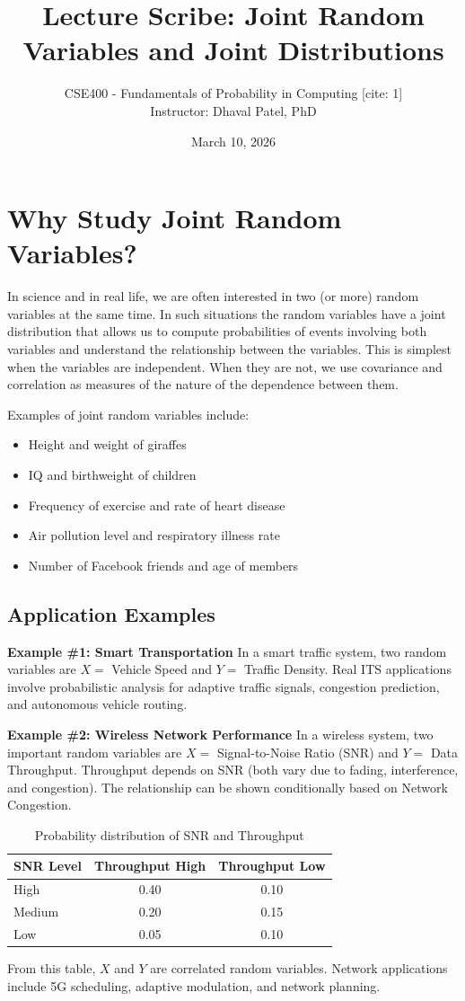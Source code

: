 \documentclass[12pt]{article}
\title{Lecture Scribe: Joint Random Variables and Joint Distributions}
\author{CSE400 - Fundamentals of Probability in Computing [cite: 1] \\ Instructor: Dhaval Patel, PhD}
\date{March 10, 2026}
\begin{document}
\maketitle

\section{Why Study Joint Random Variables?}
In science and in real life, we are often interested in two (or more) random variables at the same time. In such situations the random variables have a joint distribution that allows us to compute probabilities of events involving both variables and understand the relationship between the variables. This is simplest when the variables are independent. When they are not, we use covariance and correlation as measures of the nature of the dependence between them.

Examples of joint random variables include:
\begin{itemize}
    \item Height and weight of giraffes 
    \item IQ and birthweight of children 
    \item Frequency of exercise and rate of heart disease 
    \item Air pollution level and respiratory illness rate 
    \item Number of Facebook friends and age of members 
\end{itemize}

\subsection{Application Examples}
\textbf{Example \#1: Smart Transportation} 
In a smart traffic system, two random variables are $X = $ Vehicle Speed and $Y = $ Traffic Density. Real ITS applications involve probabilistic analysis for adaptive traffic signals, congestion prediction, and autonomous vehicle routing.

\textbf{Example \#2: Wireless Network Performance} 
In a wireless system, two important random variables are $X = $ Signal-to-Noise Ratio (SNR) and $Y = $ Data Throughput. Throughput depends on SNR (both vary due to fading, interference, and congestion). The relationship can be shown conditionally based on Network Congestion.

\begin{table}[h]
\centering
\begin{tabular}{lcc}
\toprule
SNR Level & Throughput High & Throughput Low \\
\midrule
High & 0.40 & 0.10 \\
Medium & 0.20 & 0.15 \\
Low & 0.05 & 0.10 \\
\bottomrule
\end{tabular}
\caption{Probability distribution of SNR and Throughput }
\end{table}
From this table, $X$ and $Y$ are correlated random variables. Network applications include 5G scheduling, adaptive modulation, and network planning.
\end{document}
